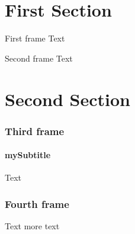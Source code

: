 \documentclass{beamer}
\begin{document}
\begin{frame}
\tableofcontents[hideallsubsections]
\end{frame}

\begin{frame}
\tableofcontents
\end{frame}

\section{First Section}

\begin{frame}{First frame}
Text
\end{frame}

\begin{frame}{Second frame}
Text
\end{frame}



\section{Second Section}

\begin{frame}
\frametitle{Third frame}
\framesubtitle{mySubtitle}
Text
\end{frame}

\begin{frame}
\frametitle{Fourth frame}
Text
\pause
more text
\end{frame}
\end{document}

